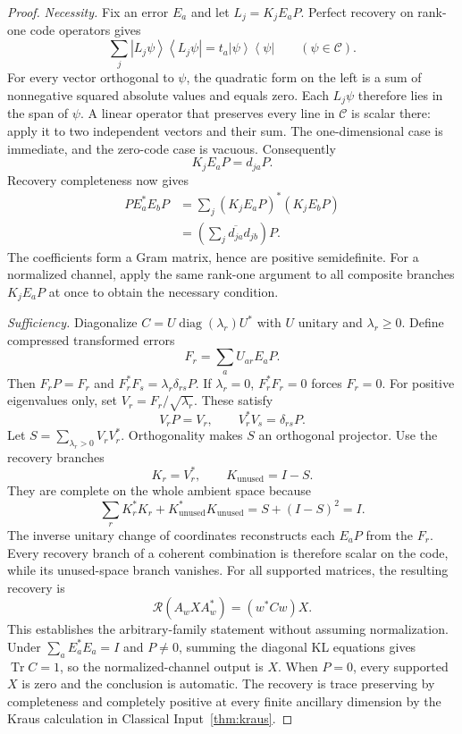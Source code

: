 \documentclass[11pt]{article}
\theoremstyle{definition}
\theoremstyle{remark}
\newcommand{\cC}{\mathcal C}
\newcommand{\cR}{\mathcal R}
\newcommand{\Tr}{\operatorname{Tr}}
\newcommand{\ket}[1]{\left|#1\right\rangle}
\newcommand{\bra}[1]{\left\langle#1\right|}
\begin{document}
\begin{proof}
\textit{Necessity.} Fix an error $E_a$ and let $L_j=K_jE_aP$. Perfect recovery on rank-one code operators gives
\[
\sum_j\ket{L_j\psi}\bra{L_j\psi}
=t_a\ket\psi\bra\psi\qquad(\psi\in\cC).
\]
For every vector orthogonal to $\psi$, the quadratic form on the left is a sum of nonnegative squared absolute values and equals zero. Each $L_j\psi$ therefore lies in the span of $\psi$. A linear operator that preserves every line in $\cC$ is scalar there: apply it to two independent vectors and their sum. The one-dimensional case is immediate, and the zero-code case is vacuous. Consequently
\[
K_jE_aP=d_{ja}P.
\]
Recovery completeness now gives
\[
\begin{aligned}
PE_a^*E_bP
&=\sum_j (K_jE_aP)^*(K_jE_bP)\\
&=\left(\sum_j\overline{d_{ja}}d_{jb}\right)P.
\end{aligned}
\]
The coefficients form a Gram matrix, hence are positive semidefinite. For a normalized channel, apply the same rank-one argument to all composite branches $K_jE_aP$ at once to obtain the necessary condition.

\textit{Sufficiency.} Diagonalize $C=U\operatorname{diag}(\lambda_r)U^*$ with $U$ unitary and $\lambda_r\ge0$. Define compressed transformed errors
\[
F_r=\sum_aU_{ar}E_aP.
\]
Then $F_rP=F_r$ and $F_r^*F_s=\lambda_r\delta_{rs}P$. If $\lambda_r=0$, $F_r^*F_r=0$ forces $F_r=0$. For positive eigenvalues only, set $V_r=F_r/\sqrt{\lambda_r}$. These satisfy
\[
V_rP=V_r,\qquad V_r^*V_s=\delta_{rs}P.
\]
Let $S=\sum_{\lambda_r>0}V_rV_r^*$. Orthogonality makes $S$ an orthogonal projector. Use the recovery branches
\[
K_r=V_r^*,\qquad K_{\mathrm{unused}}=I-S.
\]
They are complete on the whole ambient space because
\[
\sum_rK_r^*K_r+K_{\mathrm{unused}}^*K_{\mathrm{unused}}
=S+(I-S)^2=I.
\]
The inverse unitary change of coordinates reconstructs each $E_aP$ from the $F_r$. Every recovery branch of a coherent combination is therefore scalar on the code, while its unused-space branch vanishes. For all supported matrices, the resulting recovery is
\[
\cR(A_wXA_w^*)=(w^*Cw)X.
\]
This establishes the arbitrary-family statement without assuming normalization. Under $\sum_aE_a^*E_a=I$ and $P\ne0$, summing the diagonal KL equations gives $\Tr C=1$, so the normalized-channel output is $X$. When $P=0$, every supported $X$ is zero and the conclusion is automatic. The recovery is trace preserving by completeness and completely positive at every finite ancillary dimension by the Kraus calculation in Classical Input~\ref{thm:kraus}.
\end{proof}
\end{document}
